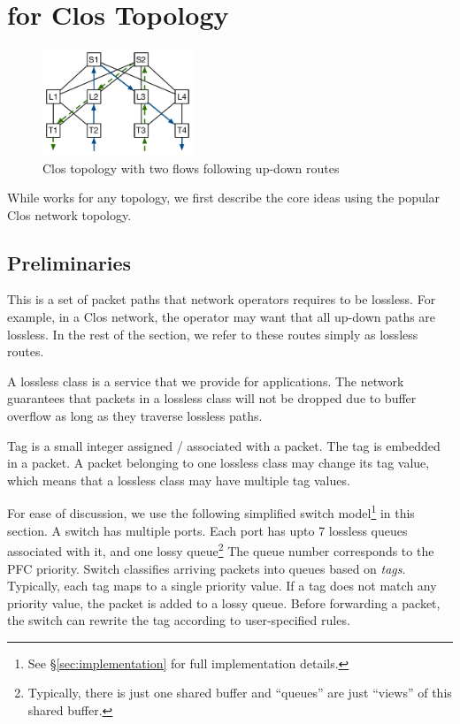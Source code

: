 \section{\sysname{} for Clos Topology}
\label{sec:specific}

\begin{figure}[t]
		\centering
		\includegraphics[width=0.4\textwidth] {figs/updown_paths}
		\caption{Clos topology with two flows following up-down routes}
		\label{fig:basic_clos}
\end{figure}

While \sysname{} works for any topology, we first describe the core ideas using
the popular Clos network topology. 

\subsection {Preliminaries}

 This is a set of packet paths that network
operators requires to be lossless. For example, in a Clos network, the
operator may want that all up-down paths are lossless. In the rest of the
section, we refer to these routes simply as lossless routes. 

 A lossless class is a service that we provide for
applications. The network guarantees that packets in a lossless class will
not be dropped due to buffer overflow as long as they traverse lossless paths.

 Tag is a small integer assigned / associated with a packet. The tag
is embedded in a packet. A packet belonging to one lossless class may change its
tag value, which means that a lossless class may have multiple tag values.

 For ease of discussion, we use the following simplified
switch model\footnote{See \S\ref{sec:implementation} for full implementation
details.} in this section.  A switch has multiple ports. Each port has upto 7
lossless queues associated with it, and one lossy queue\footnote{Typically,
there is just one shared buffer and ``queues'' are just ``views'' of this shared
buffer.} The queue number corresponds to the PFC priority.  Switch classifies
arriving packets into queues based on {\em tags}.  Typically, each tag maps to a
single priority value. If a tag does not match any priority value, the packet is
added to a lossy queue. Before forwarding a packet, the switch can rewrite the
tag according to user-specified rules.

